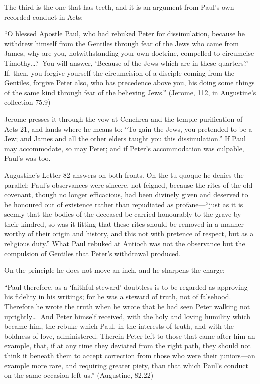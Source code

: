 The third is the one that has teeth, and it is an argument from Paul's own
recorded conduct in Acts:

\begin{studyframe}\small
``O blessed Apostle Paul, who had rebuked Peter for dissimulation, because he
withdrew himself from the Gentiles through fear of the Jews who came from
James, why are you, notwithstanding your own doctrine, compelled to
circumcise Timothy\ldots?\ You will answer, `Because of the Jews which are in
these quarters?' If, then, you forgive yourself the circumcision of a
disciple coming from the Gentiles, forgive Peter also, who has precedence
above you, his doing some things of the same kind through fear of the
believing Jews.'' (Jerome,  112, in Augustine's collection
 75.9)
\end{studyframe}

Jerome presses it through the vow at Cenchrea and the temple purification of
Acts 21, and lands where he means to: ``To gain the Jews, you pretended to be
a Jew; and James and all the other elders taught you this dissimulation.'' If
Paul may accommodate, so may Peter; and if Peter's accommodation was
culpable, Paul's was too.

Augustine's Letter 82 answers on both fronts. On the tu quoque he denies the
parallel: Paul's observances were sincere, not feigned, because the rites of
the old covenant, though no longer efficacious, had been divinely given and
deserved to be honoured out of existence rather than repudiated as profane---``just as it is seemly that the bodies of the deceased be carried honourably
to the grave by their kindred, so was it fitting that these rites should be
removed in a manner worthy of their origin and history, and this not with
pretence of respect, but as a religious duty.'' What Paul rebuked at Antioch
was not the observance but the compulsion of Gentiles that Peter's withdrawal
produced.

On the principle he does not move an inch, and he sharpens the charge:

\begin{studyframe}\small
``Paul therefore, as a `faithful steward' doubtless is to be regarded as
approving his fidelity in his writings; for he was a steward of truth, not of
falsehood. Therefore he wrote the truth when he wrote that he had seen Peter
walking not uprightly\ldots\ And Peter himself received, with the holy and
loving humility which became him, the rebuke which Paul, in the interests of
truth, and with the boldness of love, administered. Therein Peter left to
those that came after him an example, that, if at any time they deviated from
the right path, they should not think it beneath them to accept correction
from those who were their juniors---an example more rare, and requiring
greater piety, than that which Paul's conduct on the same occasion left us.''
(Augustine,  82.22)
\end{studyframe}

